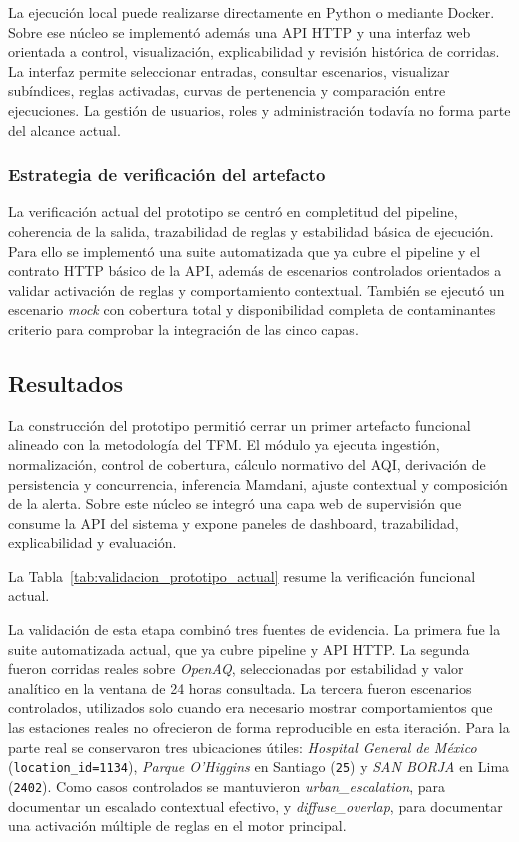 La ejecución local puede realizarse directamente en Python o mediante Docker. Sobre ese núcleo se implementó además una API HTTP y una interfaz web orientada a control, visualización, explicabilidad y revisión histórica de corridas. La interfaz permite seleccionar entradas, consultar escenarios, visualizar subíndices, reglas activadas, curvas de pertenencia y comparación entre ejecuciones. La gestión de usuarios, roles y administración todavía no forma parte del alcance actual.

\subsubsection{Estrategia de verificación del artefacto}
La verificación actual del prototipo se centró en completitud del pipeline, coherencia de la salida, trazabilidad de reglas y estabilidad básica de ejecución. Para ello se implementó una suite automatizada que ya cubre el pipeline y el contrato HTTP básico de la API, además de escenarios controlados orientados a validar activación de reglas y comportamiento contextual. También se ejecutó un escenario \textit{mock} con cobertura total y disponibilidad completa de contaminantes criterio para comprobar la integración de las cinco capas.

\subsection{Resultados}
La construcción del prototipo permitió cerrar un primer artefacto funcional alineado con la metodología del TFM. El módulo ya ejecuta ingestión, normalización, control de cobertura, cálculo normativo del AQI, derivación de persistencia y concurrencia, inferencia Mamdani, ajuste contextual y composición de la alerta. Sobre este núcleo se integró una capa web de supervisión que consume la API del sistema y expone paneles de dashboard, trazabilidad, explicabilidad y evaluación.

La Tabla~\ref{tab:validacion_prototipo_actual} resume la verificación funcional actual.



La validación de esta etapa combinó tres fuentes de evidencia. La primera fue la suite automatizada actual, que ya cubre pipeline y API HTTP. La segunda fueron corridas reales sobre \textit{OpenAQ}, seleccionadas por estabilidad y valor analítico en la ventana de 24 horas consultada. La tercera fueron escenarios controlados, utilizados solo cuando era necesario mostrar comportamientos que las estaciones reales no ofrecieron de forma reproducible en esta iteración. Para la parte real se conservaron tres ubicaciones útiles: \textit{Hospital General de México} (\texttt{location\_id=1134}), \textit{Parque O'Higgins} en Santiago (\texttt{25}) y \textit{SAN BORJA} en Lima (\texttt{2402}). Como casos controlados se mantuvieron \textit{urban\_escalation}, para documentar un escalado contextual efectivo, y \textit{diffuse\_overlap}, para documentar una activación múltiple de reglas en el motor principal.

